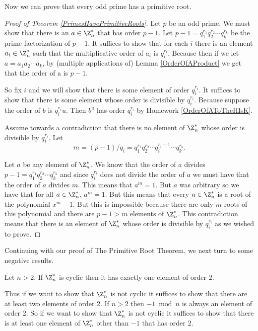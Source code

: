 \documentclass[oneside,12pt]{amsart}
\begin{document}
Now we can prove that every odd prime has a primitive root.
\begin{proof}[Proof of Theorem \ref{PrimesHavePrimitiveRoots}]
Let $p$ be an odd prime. We must show that there is an $a\in\Z^*_n$ that has order $p-1$.
Let $p-1=q_1^{r_1}q_2^{r_2}\cdots q_k^{r_k}$ be the prime factorization of $p-1$. It
suffices to show that for each $i$ there is an element $a_i\in\Z^*_n$ such that the
multiplicative order of $a_i$ is $q_i^{r_i}$. Because then if we let
$a=a_1 a_2 \cdots a_k$, by (multiple applications of) Lemma \ref{OrderOfAProduct} we get
that the order of a is $p-1$. 

So fix $i$ and we will show that there is some element of order $q_i^{r_i}$.
It suffices to show that there is some element whose order is divisible by $q_i^{r_i}$. Because
suppose the order of $b$ is $q_i^{r_i}u$. Then $b^u$ has order $q_i^{r_i}$ by Homework \ref{OrderOfAToTheHIsK}.

Assume towards a contradiction that there is no element of $\Z^*_n$ whose order is divisible by $q_i^{r_i}$.
Let 
$$m=(p-1)/q_i =q_1^{r_1}q_2^{r_2}\cdots q_i^{r_i-1}\cdots q_k^{r_k}.$$

Let $a$ be any element of $\Z^*_n$. We know that the order of $a$ divides 
$p-1=q_1^{r_1}q_2^{r_2}\cdots q_k^{r_k}$ and since $q_i^{r_i}$ does not divide the order of $a$ we must have that
the order of $a$ divides $m$. This means that $a^m=1$. But $a$ was arbitrary so we have that for all $a\in\Z^*_n$,
$a^m=1$. But this means that every $a\in\Z^*_n$ is a root of the polynomial $x^m-1$. But this is impossible because
there are only $m$ roots of this polynomial and there are $p-1>m$ elements of $\Z^*_n$. This contradiction means
that there is an element of $\Z^*_n$ whose order is divisible by $q_i^{r_i}$ as we wished to prove.
\end{proof}

Continuing with our proof of The Primitive Root Theorem, we next turn to some negative results.

\begin{homework} Let $n>2$.
If $\Z^*_n$ is cyclic then it has exactly one element of order $2$.
\end{homework}

Thus if we want to show that $\Z^*_n$ is not cyclic it suffices to show that there are at least two elements of order 2. If $n>2$ then
$-1 \bmod n$ is always an element of order 2. So if we want to show that $\Z^*_n$ is not cyclic it suffices to show that there is
at least one element of $\Z^*_n$ other than $-1$ that has order 2.
\end{document}
